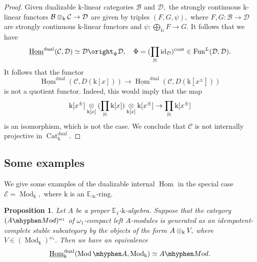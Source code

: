 \documentclass[11pt,leqno]{amsart}
\newtheorem{prop}[theo]{Proposition}
\numberwithin{equation}{section}
\def\N{\mathbb{N}}
\def\Hom{\operatorname{Hom}}
\newcommand{\tens}[1]{%
  \mathbin{\mathop{\otimes}\displaylimits_{#1}}%
}
\newcommand{\hy}{\mhyphen}
\newcommand{\biggplus}[1][]{\mathop{\bigoplus}\limits_{#1}}
\newcommand{\prodd}[1][]{\mathop{\prod}\limits_{#1}}
\newcommand{\Cat}{\operatorname{Cat}}
\newcommand{\cont}{\operatorname{cont}}
\newcommand{\dual}{\operatorname{dual}}
\newcommand{\bE}{{\mathbb E}}
\newcommand{\mk}{\mathrm k}
\newcommand{\cD}{{\mathcal D}}
\newcommand{\cB}{{\mathcal B}}
\newcommand{\cC}{{\mathcal C}}
\newcommand{\cE}{{\mathcal E}}
\newcommand{\un}{\underline}
\newcommand{\Fun}{\operatorname{Fun}}
\newcommand{\id}{\operatorname{id}}
\newcommand{\Mod}{\operatorname{Mod}}
\begin{document}
\begin{proof}
Given dualizable $\mk$-linear categories $\cB$ and $\cD,$ the strongly continuous $\mk$-linear functors $\cB\tens{\mk}\cC\to\cD$ are given by triples $(F,G,\psi),$ where $F,G:\cB\to\cD$ are strongly continuous $\mk$-linear functors and $\psi:\biggplus[\N]F\to G.$ It follows that we have
\begin{equation*}
\un{\Hom}^{\dual}(\cC,\cD)\simeq \cD\oright_{\Phi}\cD,\quad \Phi=(\prodd[\N]\id_{\cD})^{\cont}\in\Fun^L(\cD,\cD).
\end{equation*}
It follows that the functor
\begin{equation*}
\un{\Hom}^{\dual}(\cC,D(\mk[x]))\to \un{\Hom}^{\dual}(\cC,D(\mk[x^{\pm}]))
\end{equation*}
is not a quotient functor. Indeed, this would imply that the map
\begin{equation*}
\mk[x^{\pm}]\tens{\mk[x]}(\prodd[\N]\mk[x])\tens{\mk[x]}\mk[x^{\pm}]\to \prodd[\N]\mk[x^{\pm}]
\end{equation*}
is an isomorphism, which is not the case. We conclude that $\cC$ is not internally projective in $\Cat_{\mk}^{\dual}.$
\end{proof}

\subsection{Some examples}

We give some examples of the dualizable internal $\Hom$ in the special case $\cE=\Mod_{\mk},$ where $\mk$ is an $\bE_{\infty}$-ring.

\begin{prop}\label{prop:when_dualizable_Hom_is_naive}
Let $A$ be a proper $\bE_1$-$\mk$-algebra. Suppose that the category $(A\hy Mod)^{\omega_1}$ of $\omega_1$-compact left $A$-modules is generated as an idempotent-complete stable subcategory by the objects of the form $A\tens{\mk} V,$ where $V\in(\Mod_{\mk})^{\omega_1}.$ Then we have
an equivalence
\begin{equation*}
\un{\Hom}_{\mk}^{\dual}(\Mod\hy A,\Mod_{\mk})\simeq A\hy Mod.
\end{equation*}
\end{prop}
\end{document}
